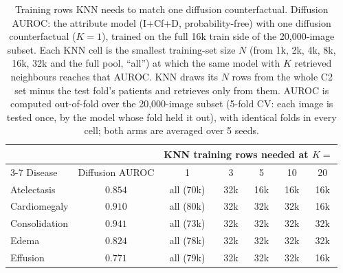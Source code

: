 \begin{table}[htbp]
\centering
\small
\caption{Training rows KNN needs to match one diffusion counterfactual. Diffusion AUROC: the attribute model (I+Cf+D, probability-free) with one diffusion counterfactual ($K=1$), trained on the full 16k train side of the 20{,}000-image subset. Each KNN cell is the smallest training-set size $N$ (from 1k, 2k, 4k, 8k, 16k, 32k and the full pool, ``all'') at which the same model with $K$ retrieved neighbours reaches that AUROC. KNN draws its $N$ rows from the whole C2 set minus the test fold's patients and retrieves only from them. AUROC is computed out-of-fold over the 20{,}000-image subset (5-fold CV: each image is tested once, by the model whose fold held it out), with identical folds in every cell; both arms are averaged over 5 seeds.}
\label{tab:subsets_knn_nstar}
\begin{tabular}{lc|ccccc}
\toprule
& & \multicolumn{5}{c}{KNN training rows needed at $K =$} \\
\cmidrule(l){3-7}
Disease & Diffusion AUROC & 1 & 3 & 5 & 10 & 20 \\
\midrule
Atelectasis & $0.854$ & all (70k) & 32k & 16k & 16k & 16k \\
Cardiomegaly & $0.910$ & all (80k) & 32k & 32k & 32k & 16k \\
Consolidation & $0.941$ & all (73k) & 32k & 32k & 32k & 32k \\
Edema & $0.824$ & all (78k) & 32k & 32k & 32k & 32k \\
Effusion & $0.771$ & all (79k) & 32k & 32k & 32k & 16k \\
\bottomrule
\end{tabular}
\end{table}
